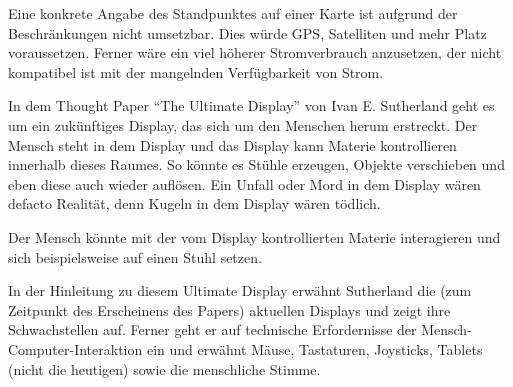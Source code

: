 \documentclass[a4paper,10pt]{scrartcl}
\begin{document}
Eine konkrete Angabe des Standpunktes auf einer Karte ist aufgrund der Beschränkungen nicht umsetzbar. Dies würde GPS, Satelliten und mehr Platz voraussetzen. Ferner wäre ein viel höherer Stromverbrauch anzusetzen, der nicht kompatibel ist mit der mangelnden Verfügbarkeit von Strom.


In dem Thought Paper "`The Ultimate Display"' von Ivan E. Sutherland geht es um ein zukünftiges Display, das sich um den Menschen herum erstreckt. Der Mensch steht in dem Display und das Display kann Materie kontrollieren innerhalb dieses Raumes. So könnte es Stühle erzeugen, Objekte verschieben und eben diese auch wieder auflösen. Ein Unfall oder Mord in dem Display wären defacto Realität, denn Kugeln in dem Display wären tödlich.

Der Mensch könnte mit der vom Display kontrollierten Materie interagieren und sich beispielsweise auf einen Stuhl setzen.

In der Hinleitung zu diesem Ultimate Display erwähnt Sutherland die (zum Zeitpunkt des Erscheinens des Papers) aktuellen Displays und zeigt ihre Schwachstellen auf. Ferner geht er auf technische Erfordernisse der Mensch-Computer-Interaktion ein und erwähnt Mäuse, Tastaturen, Joysticks, Tablets (nicht die heutigen) sowie die menschliche Stimme.
\end{document}
